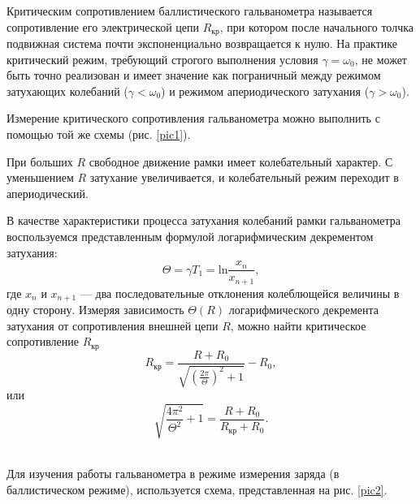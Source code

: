 \documentclass[a4paper, 12pt]{article}
\begin{document}
     \vspace{0.1cm}
    
    Критическим сопротивлением баллистического гальванометра называется сопротивление его электрической цепи $R_{кр}$, при котором после начального толчка подвижная система почти экспоненциально возвращается к нулю. На практике критический режим, требующий строгого выполнения условия $\gamma = \omega_0$, не может быть точно реализован и имеет значение как пограничный между режимом затухающих колебаний ($\gamma < \omega_0$) и режимом апериодического затухания ($\gamma > \omega_0$).
    
    Измерение критического сопротивления гальванометра можно выполнить с помощью той же схемы (рис. \ref{pic1}).
    
    При больших $R$ свободное движение рамки имеет колебательный характер. С уменьшением $R$ затухание увеличивается, и колебательный режим переходит в апериодический.

    В качестве характеристики процесса затухания колебаний рамки гальванометра воспользуемся представленным формулой логарифмическим декрементом затухания:
    \begin{equation}
        \Theta = \gamma T_1 = \mathrm{ln} \frac{x_n}{x_{n+1}},
        \label{eq3}
    \end{equation}
    где $x_n$ и $x_{n+1}$ — два последовательные отклонения колеблющейся величины в одну сторону. Измеряя зависимость $\Theta(R)$ логарифмического декремента затухания от сопротивления внешней цепи $R$, можно найти критическое сопротивление $R_{кр}$
    \begin{equation}
        R_{кр} = \frac{R + R_0}{\sqrt{\left( \frac{2 \pi}{\Theta} \right)^2 + 1}} - R_0,
        \label{eq4}
    \end{equation}
    или
    \begin{equation}
        \sqrt{\frac{4 \pi^2}{\Theta^2} + 1} = \frac{R + R_0}{R_{кр} + R_0}.
        \label{eq5}
    \end{equation} \\
    
     \vspace{0.1cm}
    
    Для изучения работы гальванометра в режиме измерения заряда (в баллистическом режиме), используется схема, представленная на рис. \ref{pic2}.
    
\end{document}
